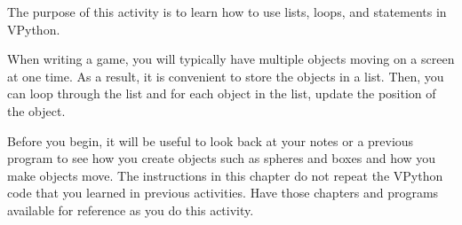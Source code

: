 
\apparatus
{}

\longgoal

The purpose of this activity is to learn how to use lists,  loops, and  statements in VPython.


\introduction

When writing a game, you will typically have multiple objects moving on a screen at one time. As a result, it is convenient to store the objects in a list. Then, you can loop through the list and for each object in the list, update the position of the object.

\procedure

Before you begin, it will be useful to look back at your notes or a previous program to see how you create objects such as spheres and boxes and how you make objects move. The instructions in this chapter do not repeat the VPython code that you learned in previous activities. Have those chapters and programs available for reference as you do this activity.

